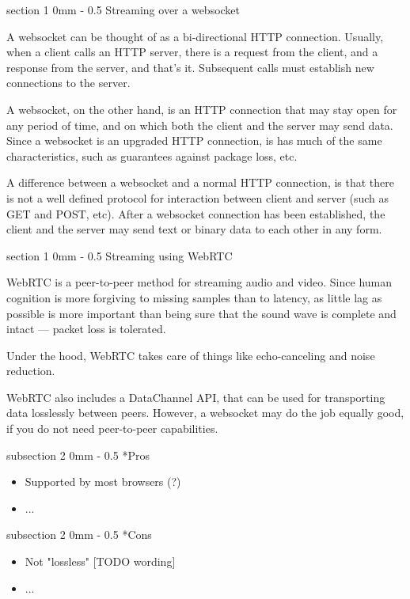 \documentclass[11pt, a4paper, twoside]{article}
\makeatletter
\renewcommand{\subsection}{\@startsection
   {subsection}%
   {2}%
   {0mm}%
   {-\baselineskip}%
   {0.5\baselineskip}%
   {\bfseries\sffamily\large}}%
\renewcommand{\section}{\@startsection
   {section}%
   {1}%
   {0mm}%
   {-\baselineskip}%
   {0.5\baselineskip}%
   {\bfseries\sffamily\Large}}%
\makeatother
\begin{document}
\section{Streaming over a websocket}

A websocket can be thought of as a bi-directional HTTP connection. Usually, when a client calls an HTTP server, there is a request from the client, and a response from the server, and that's it. Subsequent calls must establish new connections to the server.

A websocket, on the other hand, is an HTTP connection that may stay open for any period of time, and on which both the client and the server may send data. Since a websocket is an upgraded HTTP connection, is has much of the same characteristics, such as guarantees against package loss, etc.

A difference between a websocket and a normal HTTP connection, is that there is not a well defined protocol for interaction between client and server (such as GET and POST, etc). After a websocket connection has been established, the client and the server may send text or binary data to each other in any form.


\section{Streaming using WebRTC}

WebRTC is a peer-to-peer method for streaming audio and video. Since human cognition is more forgiving to missing samples than to latency, as little lag as possible is more important than being sure that the sound wave is complete and intact --- packet loss is tolerated.

Under the hood, WebRTC takes care of things like echo-canceling and noise reduction.

WebRTC also includes a DataChannel API, that can be used for transporting data losslessly between peers. However, a websocket may do the job equally good, if you do not need peer-to-peer capabilities.

\subsection*{Pros}
\begin{itemize}
\item Supported by most browsers (?)
\item ...
  \end{itemize}

\subsection*{Cons}
\begin{itemize}
\item Not "lossless" [TODO wording]
\item ...
\end{itemize}
\end{document}
